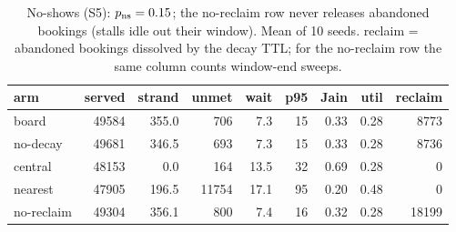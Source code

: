 \begin{table}
\centering
\caption{No-shows (S5): $p_{\rm ns}=0.15$; the no-reclaim row never releases abandoned bookings (stalls idle out their window).  Mean of 10 seeds.  reclaim = abandoned bookings
dissolved by the decay TTL; for the no-reclaim row the same column
counts window-end sweeps.}
\label{tab:e4ns}
\begin{tabular}{@{}lrrrrrrrr@{}}
\toprule
arm & served & strand & unmet & wait & p95 & Jain & util & reclaim \\
\midrule
board & 49584 & 355.0 & 706 & 7.3 & 15 & 0.33 & 0.28 & 8773 \\
no-decay & 49681 & 346.5 & 693 & 7.3 & 15 & 0.33 & 0.28 & 8736 \\
central & 48153 & 0.0 & 164 & 13.5 & 32 & 0.69 & 0.28 & 0 \\
nearest & 47905 & 196.5 & 11754 & 17.1 & 95 & 0.20 & 0.48 & 0 \\
no-reclaim & 49304 & 356.1 & 800 & 7.4 & 16 & 0.32 & 0.28 & 18199 \\
\bottomrule
\end{tabular}
\end{table}
